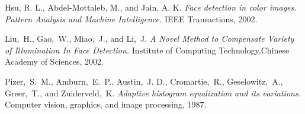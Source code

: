 \documentclass[conference]{IEEEtran}
\begin{document}
\begin{thebibliography}{1}

Hsu, R. L., Abdel-Mottaleb, M., and Jain, A. K. \emph{Face detection in color images. Pattern Analysis and Machine Intelligence.} IEEE Transactions, 2002.

Liu,~H., Gao,~W., Miao,~J., and Li,~J. \emph{A Novel Method to Compensate Variety of Illumination In Face Detection.} Institute of Computing Technology,Chinese Academy of Sciences, 2002.

Pizer,~S.~M., Amburn,~E.~P., Austin,~J. D., Cromartie,~R., Geselowitz,~A., Greer,~T., and Zuiderveld,~K. \emph{Adaptive histogram equalization and its variations.} Computer vision, graphics, and image processing, 1987.

\end{thebibliography}

\end{document}

